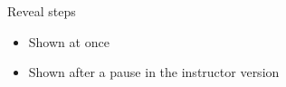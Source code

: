 \begin{standardframe}{Reveal steps}
	\begin{itemize}
		\item Shown at once
		\conditionalpause
		\item Shown after a pause in the instructor version
	\end{itemize}
\end{standardframe}
